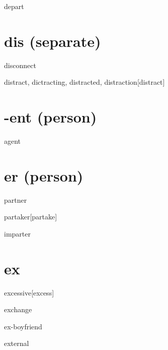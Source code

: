 \begin{wordRef}{depart}
\end{wordRef}

\section{dis (separate)}

\begin{wordRef}{disconnect}
\end{wordRef}

\begin{wordRef}{distract, dictracting, distracted, distraction}[distract]
\end{wordRef}

\section{-ent (person)}

\begin{wordRef}{agent}
\end{wordRef}

\section{er (person)}

\begin{wordRef}{partner}
\end{wordRef}

\begin{wordRef}{partaker}[partake]
\end{wordRef}

\begin{wordRef}{imparter}
\end{wordRef}

\section{ex}

\begin{wordRef}{excessive}[excess]
\end{wordRef}

\begin{wordRef}{exchange}
\end{wordRef}

\begin{wordRef}{ex-boyfriend}
\end{wordRef}

\begin{wordRef}{external}
\end{wordRef}

